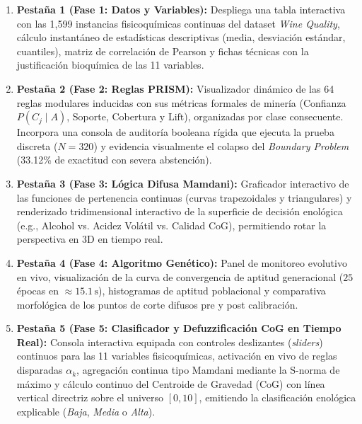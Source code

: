 \documentclass{article}
\begin{document}
\begin{enumerate}
    \item \textbf{Pestaña 1 (Fase 1: Datos y Variables):} Despliega una tabla interactiva con las 1,599 instancias fisicoquímicas continuas del dataset \textit{Wine Quality}, cálculo instantáneo de estadísticas descriptivas (media, desviación estándar, cuantiles), matriz de correlación de Pearson y fichas técnicas con la justificación bioquímica de las 11 variables.
    \item \textbf{Pestaña 2 (Fase 2: Reglas PRISM):} Visualizador dinámico de las 64 reglas modulares inducidas con sus métricas formales de minería (Confianza $P(C_j \mid A)$, Soporte, Cobertura y $\text{Lift}$), organizadas por clase consecuente. Incorpora una consola de auditoría booleana rígida que ejecuta la prueba discreta ($N=320$) y evidencia visualmente el colapso del \textit{Boundary Problem} (33.12\% de exactitud con severa abstención).
    \item \textbf{Pestaña 3 (Fase 3: Lógica Difusa Mamdani):} Graficador interactivo de las funciones de pertenencia continuas (curvas trapezoidales y triangulares) y renderizado tridimensional interactivo de la superficie de decisión enológica (e.g., Alcohol vs. Acidez Volátil vs. Calidad CoG), permitiendo rotar la perspectiva en 3D en tiempo real.
    \item \textbf{Pestaña 4 (Fase 4: Algoritmo Genético):} Panel de monitoreo evolutivo en vivo, visualización de la curva de convergencia de aptitud generacional ($25$ épocas en $\approx 15.1\,\text{s}$), histogramas de aptitud poblacional y comparativa morfológica de los puntos de corte difusos pre y post calibración.
    \item \textbf{Pestaña 5 (Fase 5: Clasificador y Defuzzificación CoG en Tiempo Real):} Consola interactiva equipada con controles deslizantes (\textit{sliders}) continuos para las 11 variables fisicoquímicas, activación en vivo de reglas disparadas $\alpha_k$, agregación continua tipo Mamdani mediante la S-norma de máximo y cálculo continuo del Centroide de Gravedad (CoG) con línea vertical directriz sobre el universo $[0, 10]$, emitiendo la clasificación enológica explicable (\textit{Baja}, \textit{Media} o \textit{Alta}).
\end{enumerate}


\printbibliography
\end{document}
